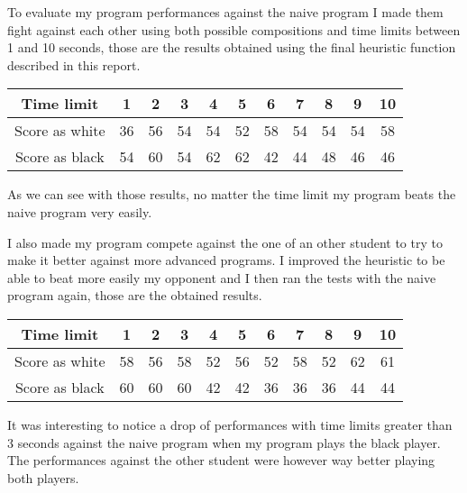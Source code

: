 To evaluate my program performances against the naive program I made them fight against each other using both possible compositions and time limits between 1 and 10 seconds, those are the results obtained using the final heuristic function described in this report.

\begin{center}
    \begin{tabular}{ c | c c c c c c c c c c } 
        Time limit & 1 & 2 & 3 & 4 & 5 & 6 & 7 & 8 & 9 & 10\\
        \hline
        Score as white & 36 & 56 & 54 & 54 & 52 & 58 & 54 & 54 & 54 & 58\\
        Score as black & 54 & 60 & 54 & 62 & 62 & 42 & 44 & 48 & 46 & 46\\
    \end{tabular}
\end{center}

As we can see with those results, no matter the time limit my program beats the naive program very easily.

I also made my program compete against the one of an other student to try to make it better against more advanced programs.
I improved the heuristic to be able to beat more easily my opponent and I then ran the tests with the naive program again, those are the obtained results.

\begin{center}
    \begin{tabular}{ c | c c c c c c c c c c } 
        Time limit & 1 & 2 & 3 & 4 & 5 & 6 & 7 & 8 & 9 & 10\\
        \hline
        Score as white & 58 & 56 & 58 & 52 & 56 & 52 & 58 & 52 & 62 & 61\\
        Score as black & 60 & 60 & 60 & 42 & 42 & 36 & 36 & 36 & 44 & 44\\
    \end{tabular}
\end{center}

It was interesting to notice a drop of performances with time limits greater than 3 seconds against the naive program when my program plays the black player.
The performances against the other student were however way better playing both players.
